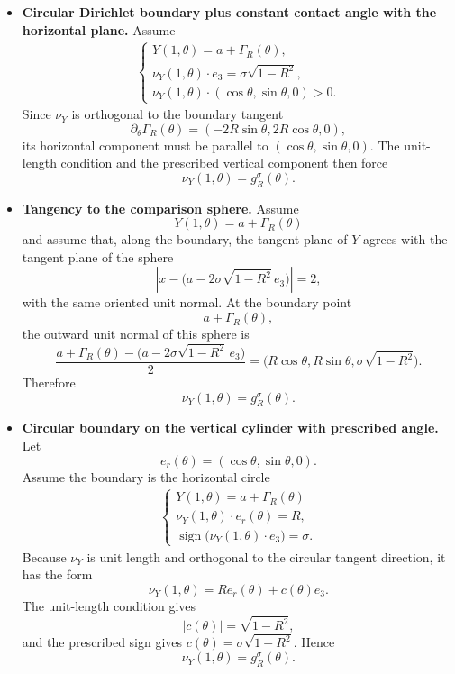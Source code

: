 \documentclass[11pt]{amsart}
\numberwithin{equation}{section}
\theoremstyle{remark}
\begin{document}
\begin{itemize}
\item\textbf{Circular Dirichlet boundary plus constant contact angle with the horizontal plane.}
Assume
\begin{align*}
    \begin{cases}
        Y(1,\theta)=a+\Gamma_R(\theta),\\
        \nu_Y(1,\theta)\cdot e_3=\sigma\sqrt{1-R^2},\\
\nu_Y(1,\theta)\cdot (\cos\theta,\sin\theta,0)>0.
    \end{cases}
\end{align*}
Since $\nu_Y$ is orthogonal to the boundary tangent
\[
\partial_\theta \Gamma_R(\theta)=(-2R\sin\theta,2R\cos\theta,0),
\]
its horizontal component must be parallel to $(\cos\theta,\sin\theta,0)$. The unit-length condition and the prescribed vertical component
then force
\[
\nu_Y(1,\theta)=g_R^\sigma(\theta).
\]
\item \textbf{Tangency to the comparison sphere.}
Assume
\[
Y(1,\theta)=a+\Gamma_R(\theta)
\]
and assume that, along the boundary, the tangent plane of $Y$ agrees with the tangent plane of the sphere
\[
\left|x-\bigl(a-2\sigma\sqrt{1-R^2}\,e_3\bigr)\right|=2,
\]
with the same oriented unit normal. At the boundary point
\[
a+\Gamma_R(\theta),
\]
the outward unit normal of this sphere is
\[
\frac{a+\Gamma_R(\theta)-\bigl(a-2\sigma\sqrt{1-R^2}\,e_3\bigr)}{2}
=
\bigl(R\cos\theta,R\sin\theta,\sigma\sqrt{1-R^2}\bigr).
\]
Therefore
\[
\nu_Y(1,\theta)=g_R^\sigma(\theta).
\]

\item \textbf{Circular boundary on the vertical cylinder with prescribed angle.}
Let
\[
e_r(\theta)=(\cos\theta,\sin\theta,0).
\]
Assume the boundary is the horizontal circle
\begin{align*}
    \begin{cases}
        Y(1,\theta)=a+\Gamma_R(\theta)\\
        \nu_Y(1,\theta)\cdot e_r(\theta)=R,
\\
\operatorname{sign}\bigl(\nu_Y(1,\theta)\cdot e_3\bigr)=\sigma.
    \end{cases}
\end{align*}
Because $\nu_Y$ is unit length and orthogonal to the circular tangent direction, it has the form
\[
\nu_Y(1,\theta)=R e_r(\theta)+c(\theta)e_3.
\]
The unit-length condition gives
\[
|c(\theta)|=\sqrt{1-R^2},
\]
and the prescribed sign gives $c(\theta)=\sigma\sqrt{1-R^2}$. Hence
\[
\nu_Y(1,\theta)=g_R^\sigma(\theta).
\]
\end{itemize}
\end{document}
